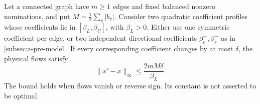 \begin{theorem}
\label{thm:a-corr-lipschitz}
Let a connected graph have $m\ge1$ edges and fixed balanced nonzero
nominations, and put $M=\tfrac12\sum_v|b_v|$. Consider two quadratic
coefficient profiles whose coefficients lie in
$[\beta_L,\beta_U]$, with $\beta_L>0$. Either use one symmetric
coefficient per edge, or two independent directional coefficients
$\beta_e^+,\beta_e^-$ as in \cref{subsec:a-pre-model}. If every
corresponding coefficient changes by at most $\delta$, the physical
flows satisfy
\begin{equation}
 \|x'-x\|_\infty\le\frac{2mM\delta}{\beta_L}.
 \label{eq:a-corr-linear-flow}
\end{equation}
The bound holds when flows vanish or reverse sign. Its constant is not
asserted to be optimal.
\end{theorem}
